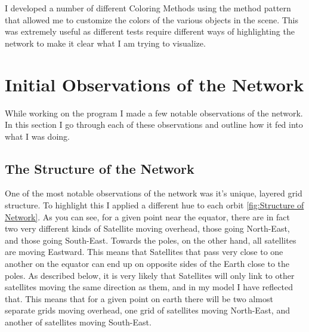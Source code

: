 \documentclass[12pt,a4paper,twoside,openright]{report}
\begin{document}
I developed a number of different Coloring Methods using the method pattern that allowed me to customize the colors of the various objects in the scene. This was extremely useful as different tests require different ways of highlighting the network to make it clear what I am trying to visualize.

\section{Initial Observations of the Network}

While working on the program I made a few notable observations of the network. In this section I go through each of these observations and outline how it fed into what I was doing.

\subsection{The Structure of the Network}

One of the most notable observations of the network was it's unique, layered grid structure. To highlight this I applied a different hue to each orbit \ref{fig:Structure of Network}. As you can see, for a given point near the equator, there are in fact two very different kinds of Satellite moving overhead, those going North-East, and those going South-East. Towards the poles, on the other hand, all satellites are moving Eastward. This means that Satellites that pass very close to one another on the equator can end up on opposite sides of the Earth close to the poles. As described below, it is very likely that Satellites will only link to other satellites moving the same direction as them, and in my model I have reflected that. This means that for a given point on earth there will be two almost separate grids moving overhead, one grid of satellites moving North-East, and another of satellites moving South-East.
\end{document}
